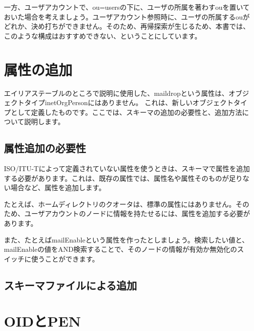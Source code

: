 一方、ユーザアカウントで、ou=usersの下に、ユーザの所属を著わすouを置いておいた場合を考えましょう。ユーザアカウント参照時に、ユーザの所属するouがどれか、決め打ちができません。そのため、再帰探索が生じるため、本書では、このような構成はおすすめできない、ということにしています。

\section{属性の追加}

エイリアステーブルのところで説明に使用した、maildropという属性は、オブジェクトタイプinetOrgPersonにはありません。
これは、新しいオブジェクトタイプとして定義したものです。ここでは、スキーマの追加の必要性と、追加方法について説明します。

\subsection{属性追加の必要性}

ISO/ITU-Tによって定義されていない属性を使うときは、スキーマで属性を追加する必要があります。これは、既存の属性では、属性名や属性そのものが足りない場合など、属性を追加します。

たとえば、ホームディレクトリのクオータは、標準の属性にはありません。そのため、ユーザアカウントのノードに情報を持たせるには、属性を追加する必要があります。

また、たとえばmailEnableという属性を作ったとしましょう。検索したい値と、mailEnableの値をAND検索することで、そのノードの情報が有効か無効化のスイッチに使うことができます。


\subsection{スキーマファイルによる追加}

\section{OIDとPEN}